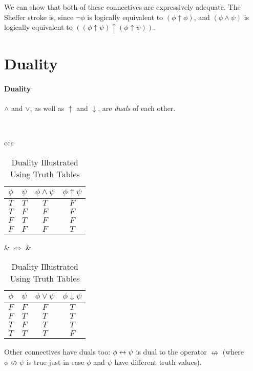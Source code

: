 We can show that both of these connectives are expressively adequate. The  Sheffer stroke is, since $\neg \phi$ is logically equivalent to $(\phi\uparrow\phi)$, and $(\phi \wedge \psi)$ is logically equivalent to  $((\phi\uparrow\psi)\uparrow(\phi\uparrow\psi))$.


\section{Duality}
\paragraph{Duality}

$\wedge$ and $\vee$, as well as $\uparrow$ and $\downarrow$, are \emph{duals} of each other. 

~
\begin{table}\centering\begin{tabular}{ccc}
{    \begin{tabular}{cc|c|c}
\toprule
$\phi$ & $\psi$ & $\phi \wedge \psi$ & $\phi \uparrow \psi$ \\
\midrule
$T$ & $T$ & $T$ &$F$\\
$T$ & $F$ & $F$&$F$\\
$F$ & $T$ & $F$ &$F$\\
$F$ & $F$ & $F$ &$T$\\
\bottomrule
	\end{tabular}} &
$\Leftrightarrow$ &
{	\begin{tabular}{cc|c|c}
$\phi$ & $\psi$ & $\phi \vee \psi$ & $\phi\downarrow\psi$ \\
\hline
$F$ & $F$ & $F$ &$T$\\
$F$ & $T$ & $T$ &$T$\\
$T$ & $F$ & $T$ &$T$\\
$T$ & $T$ & $T$	&$F$
\end{tabular}
}    \end{tabular}\caption{Duality Illustrated Using Truth Tables\label{tthree}}\end{table}
Other connectives have duals too: $\phi \leftrightarrow \psi$ is dual to the operator $\nleftrightarrow$ (where $\phi \nleftrightarrow\psi$ is true just
in case $\phi$ and $\psi$ have different truth values).


